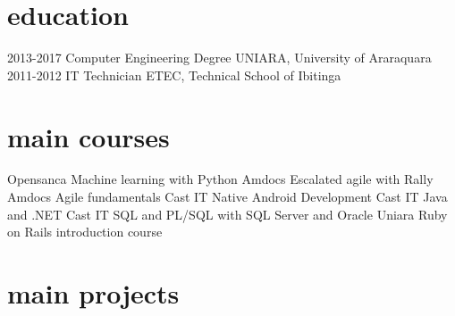 \documentclass[]{friggeri-cv}
\begin{document}
\section{education}

\begin{entrylist}
  \entry
    {2013-2017}
    {Computer Engineering Degree}
    {UNIARA, University of Araraquara}
    { }
  \entry
    {2011-2012}
    {IT Technician {\normalfont}}
    {ETEC, Technical School of Ibitinga}
    {\emph{}}
\end{entrylist}

\section{main courses}

\begin{entrylist}
  \entry
    {Opensanca}
    {Machine learning with Python}
    {}
    {\emph{}}
  \entry
    {Amdocs}
    {Escalated agile with Rally}
    {}
    {\emph{}}
  \entry
    {Amdocs}
    {Agile fundamentals}
    {}
    {\emph{}}
  \entry
    {Cast IT}
    {Native Android Development}
    {}
    {\emph{}}
  \entry
    {Cast IT}
    {Java and .NET}
    {}
    {\emph{}}
   \entry
    {Cast IT}
    {SQL and PL/SQL with SQL Server and Oracle}
    {}
    {\emph{}}
   \entry
    {Uniara}
    {Ruby on Rails introduction course}
    {}
    {\emph{}}
    
\end{entrylist}

\section{main projects}
\end{document}

